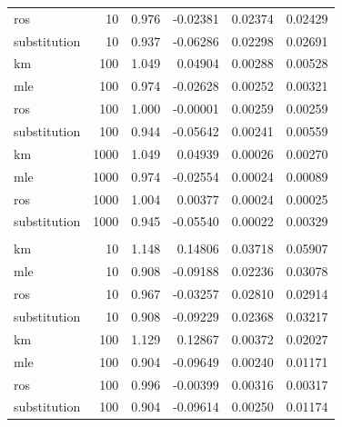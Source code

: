 \documentclass[12pt, twoside]{amherstthesis}
\begin{document}
\begin{table}
\begin{tabular}[t]{lrrrrr}
\hspace{1em}ros & 10 & 0.976 & -0.02381 & 0.02374 & 0.02429\\
\hspace{1em}substitution & 10 & 0.937 & -0.06286 & 0.02298 & 0.02691\\
\hspace{1em}km & 100 & 1.049 & 0.04904 & 0.00288 & 0.00528\\
\hspace{1em}mle & 100 & 0.974 & -0.02628 & 0.00252 & 0.00321\\
\hspace{1em}ros & 100 & 1.000 & -0.00001 & 0.00259 & 0.00259\\
\hspace{1em}substitution & 100 & 0.944 & -0.05642 & 0.00241 & 0.00559\\
\hspace{1em}km & 1000 & 1.049 & 0.04939 & 0.00026 & 0.00270\\
\hspace{1em}mle & 1000 & 0.974 & -0.02554 & 0.00024 & 0.00089\\
\hspace{1em}ros & 1000 & 1.004 & 0.00377 & 0.00024 & 0.00025\\
\hspace{1em}substitution & 1000 & 0.945 & -0.05540 & 0.00022 & 0.00329\\
\addlinespace[1em]
\multicolumn{6}{l}{\textbf{Censoring Rate = 0.5}}\\
\hspace{1em}km & 10 & 1.148 & 0.14806 & 0.03718 & 0.05907\\
\hspace{1em}mle & 10 & 0.908 & -0.09188 & 0.02236 & 0.03078\\
\hspace{1em}ros & 10 & 0.967 & -0.03257 & 0.02810 & 0.02914\\
\hspace{1em}substitution & 10 & 0.908 & -0.09229 & 0.02368 & 0.03217\\
\hspace{1em}km & 100 & 1.129 & 0.12867 & 0.00372 & 0.02027\\
\hspace{1em}mle & 100 & 0.904 & -0.09649 & 0.00240 & 0.01171\\
\hspace{1em}ros & 100 & 0.996 & -0.00399 & 0.00316 & 0.00317\\
\hspace{1em}substitution & 100 & 0.904 & -0.09614 & 0.00250 & 0.01174\\

\end{tabular}
\end{table}
\end{document}
